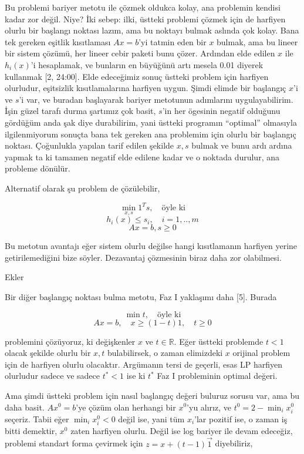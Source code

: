 \documentclass[12pt,fleqn]{article}\usepackage{../../common}
\begin{document}
Bu problemi bariyer metotu ile çözmek oldukca kolay, ana problemin kendisi
kadar zor değil. Niye? İki sebep: ilki, üstteki problemi çözmek için de
harfiyen olurlu bir başlangı noktası lazım, ama bu noktayı bulmak aslında
çok kolay. Bana tek gereken eşitlik kısıtlaması $Ax = b$'yi tatmin eden bir
$x$ bulmak, ama bu lineer bir sistem çözümü, her lineer cebir paketi bunu
çözer. Ardından elde edilen $x$ ile $h_i(x)$'i hesaplamak, ve bunların en
büyüğünü artı mesela 0.01 diyerek kullanmak [2, 24:00]. Elde edeceğimiz
sonuç üstteki problem için harfiyen olurludur, eşitsizlik kısıtlamalarına
harfiyen uygun. Şimdi elimde bir başlangıç $x$'i ve $s$'i var, ve buradan
başlayarak bariyer metotunun adımlarını uygulayabilirim. İşin güzel tarafı
durma şartımız çok basit, $s$'in her ögesinin negatif olduğunu gördüğüm
anda şak diye durabilirim, yani üstteki programın ``optimal'' olmasıyla
ilgilenmiyorum sonuçta bana tek gereken ana problemim için olurlu bir
başlangıç noktası. Çoğunlukla yapılan tarif edilen şekilde $x,s$ bulmak ve
bunu ardı ardına yapmak ta ki tamamen negatif elde edilene kadar ve o
noktada durulur, ana probleme dönülür.

Alternatif olarak şu problem de çözülebilir,

$$
\min_{x,s} 1^T s, \quad \textrm{öyle ki}
$$
$$
h_i(x) \le s_i, \quad i=1,..,m
$$
$$
Ax = b, s \ge 0
$$

Bu metotun avantajı eğer sistem olurlu değilse hangi kısıtlamanın harfiyen
yerine getirilemediğini bize söyler. Dezavantaj çözmesinin biraz daha zor
olabilmesi.

Ekler

Bir diğer başlangıç noktası bulma metotu, Faz I yaklaşımı daha [5]. Burada

$$
\min t, \quad \textrm{öyle ki}
$$
$$
Ax = b, \quad x \ge (1-t) 1, \quad t \ge 0
$$

problemini çözüyoruz, ki değişkenler $x$ ve $t \in \mathbb{R}$. Eğer
üstteki problemde $t < 1$ olacak şekilde olurlu bir $x,t$ bulabilirsek, o
zaman elimizdeki $x$ orijinal problem için de harfiyen olurlu
olacaktır. Argümanın tersi de geçerli, esas LP harfiyen olurludur sadece ve
sadece $t^* < 1$ ise ki $t^*$ Faz I probleminin optimal değeri.

Ama şimdi üstteki problem için nasıl başlangıç değeri buluruz sorusu var,
ama bu daha basit. $Ax^0 = b$'ye çözüm olan herhangi bir $x^0$'yu alırız,
ve $t^0 = 2 - \min_i x_i^0$ seçeriz. Tabii eğer $\min_i x_i^0 < 0$ değil
ise, yani tüm $x_i$'lar pozitif ise, o zaman iş bitti demektir, $x^0$ zaten
harfiyen olurlu. Değil ise log bariyer ile devam edeceğiz, problemi
standart forma çevirmek için $z = x + (t-1)\vec{1}$ diyebiliriz,
\end{document}
